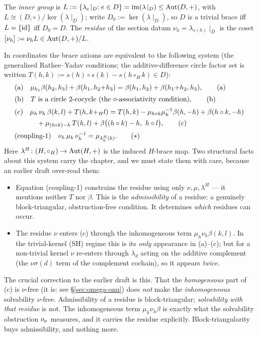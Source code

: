 \begin{definition}\label{def:residue}
The \emph{inner group} is $L:=\{\lambda_e\!\mid_D : e\in D\}=\operatorname{im}
(\lambda\!\mid_D)\le\mathrm{Aut}(D,+)$, with $L\cong(D,\circ)/\ker(\lambda\!\mid_D)$; write
$D_0:=\ker(\lambda\!\mid_D)$, so $D$ is a trivial brace iff $L=\{\mathrm{id}\}$ iff
$D_0=D$. The \emph{residue} of the section datum $\nu_h=\lambda_{s(h)}\!\mid_D$ is
the coset $[\nu_h]:=\nu_h L\in\mathrm{Aut}(D,+)/L$.
\end{definition}

In coordinates the brace axioms are equivalent to the following system (the
generalised Rathee--Yadav conditions; the additive-difference circle factor set is
written $T(h,k):=s(h)\circ s(k)-s(h\circ_H k)\in D$):
\begin{align}
  &\text{\rm(a)}\quad \mu_{h_1}\beta(h_2,h_3)+\beta(h_1,h_2{+}h_3)
      =\beta(h_1,h_2)+\beta(h_1{+}h_2,h_3), \tag{a}\\[2pt]
  &\text{\rm(b)}\quad T\ \text{is a circle $2$-cocycle (the $\circ$-associativity condition)}, \tag{b}\\[2pt]
  &\text{\rm(c)}\quad
     \mu_h\,\nu_h\,\beta(k,l)+T(h,k{+}_H l)
     = T(h,k)-\mu_{h\circ k}\mu_h^{-1}\beta(h,-h)+\beta(h\circ k,-h) \notag\\
  &\hphantom{\text{\rm(c)}\quad}\quad
     {}+\mu_{(h\circ k)-h}\,T(h,l)+\beta\bigl((h\circ k)-h,\ h\circ l\bigr), \tag{c}\\[2pt]
  &\text{\rm(coupling-1)}\quad \nu_h\,\mu_k\,\nu_h^{-1}=\mu_{\lambda^H_h(k)}. \tag{$\ast$}
\end{align}
Here $\lambda^H\colon(H,\circ_H)\to\mathrm{Aut}(H,+)$ is the induced $H$-brace map. Two
structural facts about this system carry the chapter, and we must state them with
care, because an earlier draft over-read them:
\begin{itemize}
\item Equation \textup{(coupling-1)} constrains the residue using only
   $\nu,\mu,\lambda^H$ --- it mentions neither $T$ nor $\beta$. This is the
   \emph{admissibility} of a residue: a genuinely block-triangular, obstruction-free
   condition. It determines \emph{which} residues can occur.
\item The residue $\nu$ enters \textup{(c)} through the inhomogeneous term
   $\mu_h\nu_h\beta(k,l)$. In the trivial-kernel (SH) regime this is its
   \emph{only} appearance in \textup{(a)--(c)}; but for a non-trivial kernel
   $\nu$ re-enters through $\lambda_d$ acting on the additive complement (the
   $\nu\sigma(d)$ term of the complement cochain), so it appears \emph{twice}.
\end{itemize}
The crucial correction to the earlier draft is this. That the \emph{homogeneous}
part of \textup{(c)} is $\nu$-free (it is: see \S\ref{sec:omega-onu}) does
\emph{not} make the \emph{inhomogeneous} solvability $\nu$-free. Admissibility of a
residue is block-triangular; \emph{solvability with that residue} is not. The
inhomogeneous term $\mu_h\nu_h\beta$ is exactly what the solvability obstruction
$o_\nu$ measures, and it carries the residue explicitly. Block-triangularity buys
admissibility, and nothing more.


